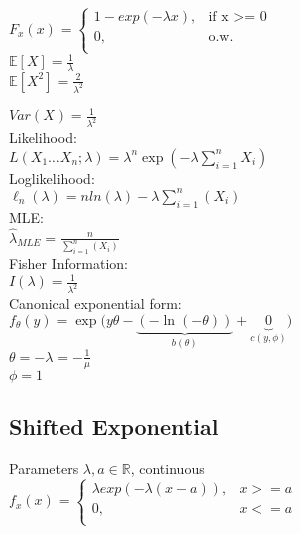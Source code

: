 $ F_x(x)=
	\begin{cases}
		 1-exp(-\lambda x),&\text{if x >= 0}\\
		0,&\text{o.w.}\\
	\end{cases}
$\\

$\mathbb{E}[X]=\frac{1}{\lambda}$\\

$\mathbb{E}[X^2]=\frac{2}{\lambda^2}$

$Var(X)=\frac{1}{\lambda^2}$\\

Likelihood:\\
$L(X_1\dots X_n;\lambda)=\lambda^n\exp\left(-\lambda\sum_{i=1}^n X_i\right)$\\

Loglikelihood:\\

$\ell_n (\lambda)= n ln(\lambda) - \lambda \sum_{i=1}^n (X_i)$\\

MLE:\\

$\hat{\lambda}_{MLE}= \frac{n}{\sum^{n}_{i=1}(X_i)}$\\

Fisher Information:\\

$I(\lambda)= \frac{1}{\lambda^2}$\\

Canonical exponential form:\\

$f_{\theta}(y) = \exp\big(y\theta - \underbrace{(-\ln(-\theta))}_{b(\theta)} + \underbrace{0}_{c(y, \phi)}\big)$\\

$\theta = -\lambda = -\frac1{\mu}$\\

$\phi = 1$

\subsection*{Shifted Exponential}

Parameters $\lambda, a \in \mathbb{R}$, continuous\\
$ f_x(x)=
	\begin{cases}
		 \lambda exp(-\lambda(x - a )),&{x >= a}\\
		0,&{x <= a}\\
	\end{cases}
$\\

